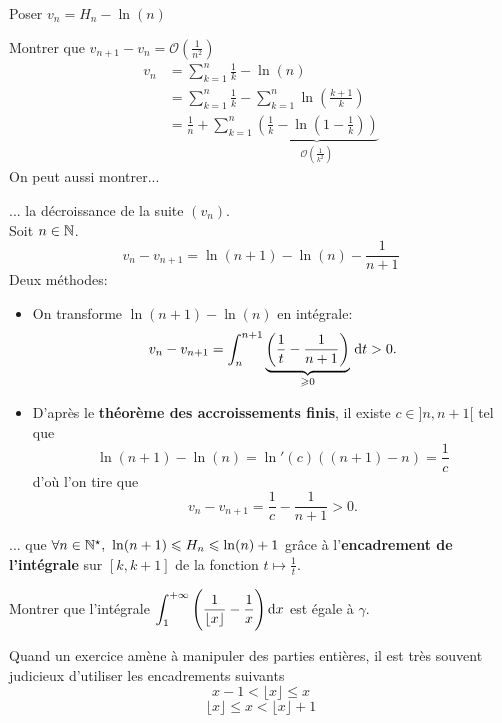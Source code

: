 \begin{preuve}
    \item Poser $v_n = H_n - \ln(n)$
    \item Montrer que $v_{n+1}-v_n = \mathcal{O}\left(\frac{1}{n^2}\right)$\\
    \begin{align*}
        v_n &= \sum_{k=1}^n\frac{1}{k} -\ln(n) \\
        &= \sum_{k=1}^n \frac{1}{k} -\sum_{k=1}^n  \ln\left( \frac{k+1}{k} \right) \\
        &= \frac{1}{n} + \sum_{k=1}^n \underbrace{\left( \frac{1}{k} - \ln\left(1-\frac{1}{k}\right)\right)}_{\mathcal{O}\left(\frac{1}{k^2}\right)}
    \end{align*}
    On peut aussi montrer...
    \item ... la décroissance de la suite $(v_n)$. \\
    Soit $n \in \mathbb{N}$. 
    $$v_n - v_{n+1} = \ln(n+1) - \ln(n) - \frac{1}{n+1}$$
    Deux méthodes:
    \begin{itemize}
        \item On transforme $\ln(n+1) - \ln(n)$ en intégrale:
        $$v_n - v_{n+1} = \int_{n}^{n+1} \underbrace{\left( \frac{1}{t} - \frac{1}{n+1} \right)}_{\geqslant 0} \, \mathrm{d} t > 0.$$
        \item D'après le \textbf{théorème des accroissements finis}, il existe $c \in ]n, n+1[$ tel que 
        $$\ln(n+1) - \ln(n) = \ln'(c)((n+1) - n) = \frac{1}{c}$$
        d'où l'on tire que 
        $$v_n - v_{n+1} = \frac{1}{c} - \frac{1}{n+1} > 0.$$
    \end{itemize}
    \item ... que $\forall n \in \mathbb{N}^\star,\ \ln(n+1) \leqslant H_n \leqslant \ln(n) + 1$ grâce à l'\textbf{encadrement de l'intégrale} sur $[k, k+1]$ de la fonction $t \mapsto \frac{1}{t}$.
\end{preuve}


\begin{exercice}
    Montrer que l'intégrale $\displaystyle \int_1^{+\infty} \Bigg( \frac{1}{\lfloor x \rfloor} - \frac{1}{x}\Bigg) \, \mathrm{d} x$ est égale à $\gamma$.
\end{exercice}

\begin{methode}
    Quand un exercice amène à manipuler des parties entières, il est très souvent judicieux d'utiliser les encadrements suivants
    $$x-1 < \lfloor x \rfloor \leqslant x$$
    $$\lfloor x \rfloor \leqslant x < \lfloor x \rfloor + 1$$
\end{methode}

\begin{solution}
\end{solution}